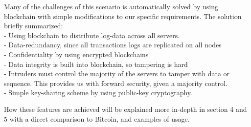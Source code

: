 Many of the challenges of this scenario is automatically solved by using blockchain with simple modifications to our specific requirements.
The solution briefly summarized:\\
- Using blockchain to distribute log-data across all servers.\\
- Data-redundancy, since all transactions logs are replicated on all nodes\\
- Confidentiality by using encrypted blockchains\\
- Data integrity is built into blockchain, so tampering is hard\\
- Intruders must control the majority of the servers to tamper with data or sequence. This provides us with forward security, given a majority control.\\
- Simple key-sharing scheme by using public-key cryptography.

How these features are achieved will be explained more in-depth in section 4 and 5 with a direct comparison to Bitcoin, and examples of usage.
